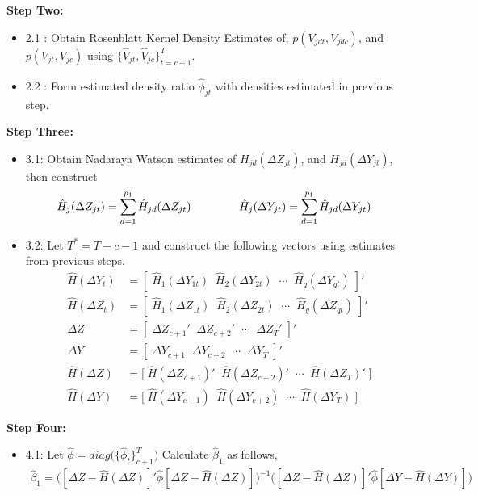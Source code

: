 \documentclass[10pt]{article}
\begin{document}
\noindent \bf Step Two: \rm 
\begin{itemize} 
    \item 2.1 : Obtain Rosenblatt Kernel Density Estimates of, $p(V_{jdt},V_{jdc})$, and $p(V_{jt},V_{jc})$ using $\{\hat{V}_{jt}, \hat{V}_{jc}\}_{t=c+1}^T$.  
    \item 2.2 : Form estimated density ratio $\hat{\phi}_{jt}$ with densities estimated in previous step. 
\end{itemize}
\noindent \bf Step Three: \rm 
\begin{itemize} 
    \item 3.1: Obtain Nadaraya Watson estimates of $H_{jd}(\Delta Z_{jt})$, and $H_{jd}(\Delta Y_{jt})$, then construct 
    \begin{align*} 
    \hat{H}_j(\Delta Z_{jt}) &= \sum_{d=1}^{p_1} \hat{H}_{jd}(\Delta Z_{jt})  \hspace{1.5cm}
%
\hat{H}_j(\Delta Y_{jt}) = \sum_{d=1}^{p_1} \hat{H}_{jd}(\Delta Y_{jt}) 
    \end{align*}

    \item 3.2: Let $T^* = T - c-1$  and construct the following vectors using estimates from previous steps. 
    \begin{align*} 
   \hat{H}(\Delta Y_t)  &= [ \; \hat{H}_1(\Delta Y_{1t}) \;\; \hat{H}_2(\Delta Y_{2t}) \;\; \cdots \;\; \hat{H}_q(\Delta Y_{qt}) \; ]'\\
%
\hat{H}(\Delta Z_t)  &= [ \; \hat{H}_1(\Delta Z_{1t}) \;\; \hat{H}_2(\Delta Z_{2t}) \;\; \cdots \;\; \hat{H}_q(\Delta Z_{qt}) \; ]'\\
%
\Delta Z &= [ \; \Delta Z_{c+1}' \;\; \Delta Z_{c+2}' \;\; \cdots \;\; \Delta Z_{T}' \;]' \\
%
 \Delta Y &= [ \; \Delta Y_{c+1} \;\; \Delta Y_{c+2} \;\; \cdots \;\; \Delta Y_{T} \;]' \\
%
\hat{H}(\Delta Z) &= \big[\; \hat{H}(\Delta Z_{c+1})' \;\; \hat{H}(\Delta Z_{c +2})' \;\;\cdots \;\; \hat{H}(\Delta Z_{T})' \; \big] \\
%
 \hat{H}(\Delta Y) &= \big[\; \hat{H}(\Delta Y_{c+1}) \;\; \hat{H}(\Delta Y_{c +2}) \;\;\cdots \;\; \hat{H}(\Delta Y_{T}) \; \big]
\end{align*}
\end{itemize}
%
\noindent \bf Step Four:\rm 
\begin{itemize}
    \item 4.1: Let $\hat{\phi} = diag\big( \{\hat{\phi}_t\}_{c+1}^T \big)$ Calculate $\hat{\beta}_1$ as follows,  
    \begin{align*} 
  \hat{\beta}_1 = \Big( [\Delta Z - \hat{H}(\Delta Z)]' \hat{\phi} [\Delta Z - \hat{H}(\Delta Z)] \Big)^{-1} \Big( [\Delta Z - \hat{H}(\Delta Z)]' \hat{\phi} [\Delta Y - \hat{H}(\Delta Y)] \Big)
    \end{align*}
\end{itemize}
\newpage
\end{document}
